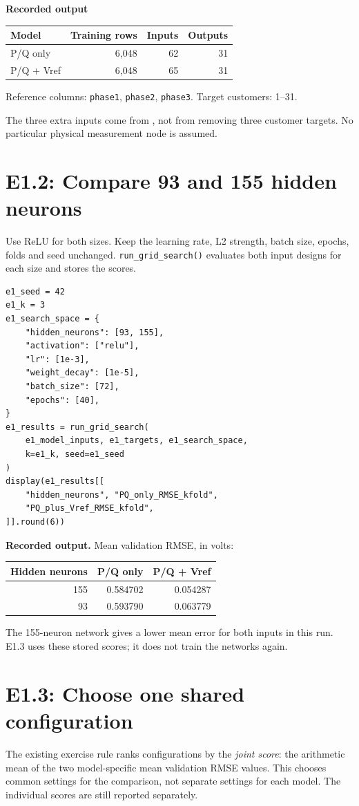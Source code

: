 \documentclass[11pt,a4paper]{article}
\begin{document}
\textbf{Recorded output}
\begin{center}
\begin{tabular}{lrrr}
\toprule
Model & Training rows & Inputs & Outputs \\
\midrule
P/Q only & 6,048 & 62 & 31 \\
P/Q + Vref & 6,048 & 65 & 31 \\
\bottomrule
\end{tabular}
\end{center}
Reference columns: \texttt{phase1}, \texttt{phase2}, \texttt{phase3}.
Target customers: 1--31.

The three extra inputs come from , not from removing
three customer targets. No particular physical measurement node is assumed.

\clearpage
\section*{E1.2: Compare 93 and 155 hidden neurons}
Use ReLU for both sizes. Keep the learning rate, L2 strength, batch size,
epochs, folds and seed unchanged. \texttt{run\_grid\_search()} evaluates
both input designs for each size and stores the scores.

\begin{lstlisting}
e1_seed = 42
e1_k = 3
e1_search_space = {
    "hidden_neurons": [93, 155],
    "activation": ["relu"],
    "lr": [1e-3],
    "weight_decay": [1e-5],
    "batch_size": [72],
    "epochs": [40],
}
e1_results = run_grid_search(
    e1_model_inputs, e1_targets, e1_search_space,
    k=e1_k, seed=e1_seed
)
display(e1_results[[
    "hidden_neurons", "PQ_only_RMSE_kfold",
    "PQ_plus_Vref_RMSE_kfold",
]].round(6))
\end{lstlisting}

\textbf{Recorded output.} Mean validation RMSE, in volts:
\begin{center}
\begin{tabular}{rrr}
\toprule
Hidden neurons & P/Q only & P/Q + Vref \\
\midrule
155 & 0.584702 & 0.054287 \\
93 & 0.593790 & 0.063779 \\
\bottomrule
\end{tabular}
\end{center}
The 155-neuron network gives a lower mean error for both inputs in this
run. E1.3 uses these stored scores; it does not train the networks again.

\clearpage
\section*{E1.3: Choose one shared configuration}
The existing exercise rule ranks configurations by the \emph{joint score}:
the arithmetic mean of the two model-specific mean validation RMSE values.
This chooses common settings for the comparison, not separate settings
for each model. The individual scores are still reported separately.
\end{document}
